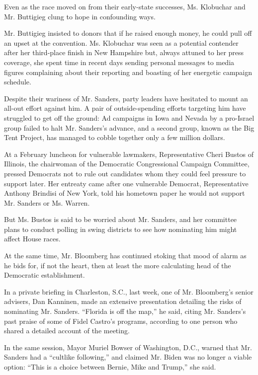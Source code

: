 Even as the race moved on from their early-state successes, Ms.
Klobuchar and Mr. Buttigieg clung to hope in confounding ways.

Mr. Buttigieg insisted to donors that if he raised enough money, he
could pull off an upset at the convention. Ms. Klobuchar was seen as a
potential contender after her third-place finish in New Hampshire but,
always attuned to her press coverage, she spent time in recent days
sending personal messages to media figures complaining about their
reporting and boasting of her energetic campaign schedule.

Despite their wariness of Mr. Sanders, party leaders have hesitated to
mount an all-out effort against him. A pair of outside-spending efforts
targeting him have struggled to get off the ground: Ad campaigns in Iowa
and Nevada by a pro-Israel group failed to halt Mr. Sanders's advance,
and a second group, known as the Big Tent Project, has managed to cobble
together only a few million dollars.

At a February luncheon for vulnerable lawmakers, Representative Cheri
Bustos of Illinois, the chairwoman of the Democratic Congressional
Campaign Committee, pressed Democrats not to rule out candidates whom
they could feel pressure to support later. Her entreaty came after one
vulnerable Democrat, Representative Anthony Brindisi of New York, told
his hometown paper he would not support Mr. Sanders or Ms. Warren.

But Ms. Bustos is said to be worried about Mr. Sanders, and her
committee plans to conduct polling in swing districts to see how
nominating him might affect House races.

At the same time, Mr. Bloomberg has continued stoking that mood of alarm
as he bids for, if not the heart, then at least the more calculating
head of the Democratic establishment.

In a private briefing in Charleston, S.C., last week, one of Mr.
Bloomberg's senior advisers, Dan Kanninen, made an extensive
presentation detailing the risks of nominating Mr. Sanders. ``Florida is
off the map,'' he said, citing Mr. Sanders's past praise of some of
Fidel Castro's programs, according to one person who shared a detailed
account of the meeting.

In the same session, Mayor Muriel Bowser of Washington, D.C., warned
that Mr. Sanders had a ``cultlike following,'' and claimed Mr. Biden was
no longer a viable option: ``This is a choice between Bernie, Mike and
Trump,'' she said.

